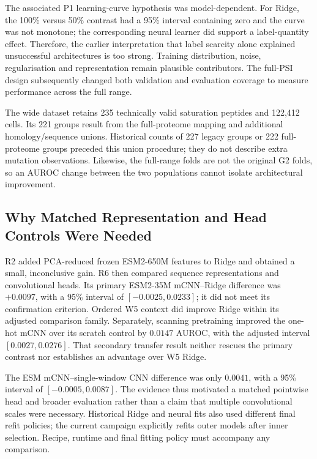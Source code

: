 The associated P1 learning-curve hypothesis was model-dependent. For Ridge, the 100\% versus
50\% contrast had a 95\% interval containing zero and the curve was not monotone; the corresponding
neural learner did support a label-quantity effect. Therefore, the earlier interpretation that label
scarcity alone explained unsuccessful architectures is too strong. Training distribution, noise,
regularisation and representation remain plausible contributors. The full-PSI design subsequently
changed both validation and evaluation coverage to measure performance across the full range.

The wide dataset retains 235 technically valid saturation peptides and 122,412 cells. Its 221 groups
result from the full-proteome mapping and additional homology/sequence unions. Historical counts
of 227 legacy groups or 222 full-proteome groups preceded this union procedure; they do not
describe extra mutation observations. Likewise, the full-range folds are not the original G2 folds,
so an AUROC change between the two populations cannot isolate architectural improvement.

\subsection{Why Matched Representation and Head Controls Were Needed}
R2 added PCA-reduced frozen ESM2-650M features to Ridge and obtained a small, inconclusive
gain. R6 then compared sequence representations and convolutional heads. Its primary
ESM2-35M mCNN--Ridge difference was $+0.0097$, with a 95\% interval of
$[-0.0025,0.0233]$; it did not meet its confirmation criterion. Ordered W5 context did improve
Ridge within its adjusted comparison family. Separately, scanning pretraining improved the
one-hot mCNN over its scratch control by $0.0147$ AUROC, with the adjusted interval
$[0.0027,0.0276]$. That secondary transfer result neither rescues the primary contrast nor
establishes an advantage over W5 Ridge.

The ESM mCNN--single-window CNN difference was only $0.0041$, with a 95\% interval of
$[-0.0005,0.0087]$. The evidence thus motivated a matched pointwise head and broader
evaluation rather than a claim that multiple convolutional scales were necessary. Historical Ridge
and neural fits also used different final refit policies; the current campaign explicitly refits outer
models after inner selection. Recipe, runtime and final fitting policy must accompany any comparison.

